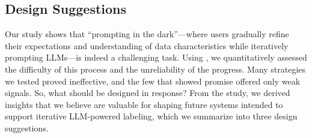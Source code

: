 \subsection{Design Suggestions}

Our study shows that ``prompting in the dark''---where users gradually refine their expectations and understanding of data characteristics while iteratively prompting LLMs---is indeed a challenging task. 
Using \system, we quantitatively assessed the difficulty of this process and the unreliability of the progress. 
Many strategies we tested proved ineffective, and the few that showed promise offered only weak signals. 
So, what should be designed in response? 
From the study, we derived insights that we believe are valuable for shaping future systems intended to support iterative LLM-powered labeling, which we summarize into three design suggestions.



